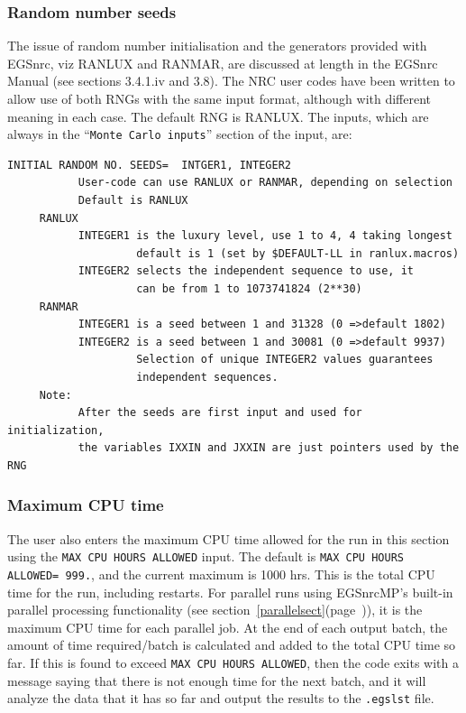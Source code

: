 \documentclass[12pt,twoside]{article}  %
\newcommand{\lpage}[1]{(page~\pageref{#1})}
\begin{document}
\subsubsection{Random number seeds}
\label{rngsect}
The issue of random number initialisation and the generators provided with
EGSnrc, viz RANLUX and RANMAR, are discussed at length in the EGSnrc
Manual\cite{KR00} (see sections 3.4.1.iv and 3.8).  The NRC user codes have
been written to allow use of both RNGs with the same input format, although
with different meaning in each case. The default RNG is RANLUX.  The
inputs, which are always in the ``{\tt Monte Carlo inputs}'' section of the
input, are:
\begin{verbatim}
INITIAL RANDOM NO. SEEDS=  INTGER1, INTEGER2
           User-code can use RANLUX or RANMAR, depending on selection
           Default is RANLUX
     RANLUX
           INTEGER1 is the luxury level, use 1 to 4, 4 taking longest
                    default is 1 (set by $DEFAULT-LL in ranlux.macros)
           INTEGER2 selects the independent sequence to use, it
                    can be from 1 to 1073741824 (2**30)
     RANMAR
           INTEGER1 is a seed between 1 and 31328 (0 =>default 1802)
           INTEGER2 is a seed between 1 and 30081 (0 =>default 9937)
                    Selection of unique INTEGER2 values guarantees 
                    independent sequences.
     Note: 
           After the seeds are first input and used for initialization,
           the variables IXXIN and JXXIN are just pointers used by the RNG
\end{verbatim}

\subsubsection{Maximum CPU time}
\label{cpusect}
The user also enters the maximum CPU time allowed for the run in
this section using the {\tt MAX CPU HOURS ALLOWED} input.
The default is {\tt MAX CPU HOURS ALLOWED= 999.}, and the
current maximum is 1000 hrs.  This is the total CPU time for the run,
including restarts.  For parallel runs using EGSnrcMP's built-in
parallel processing functionality 
(see section~\ref{parallelsect}\lpage{parallelsect}), it is the maximum
CPU time for each parallel job.  At the end of each output batch, the amount
of time required/batch is calculated and added to the total CPU time
so far.  If this is found to exceed {\tt MAX CPU HOURS ALLOWED},
then the code exits with a message saying that there is not enough time
for the next batch, and it will analyze the data that it has so far and
output the results to the {\tt .egslst} file.
\end{document}
